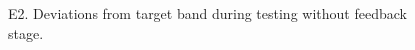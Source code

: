\documentclass[
  letterpaper,
  DIV=11,
  numbers=noendperiod,
  oneside]{scrartcl}
\begin{document}
\begin{figure}


\caption{\label{fig-e2-test-dev}E2. Deviations from target band during
testing without feedback stage.}

\end{figure}%
\end{document}
